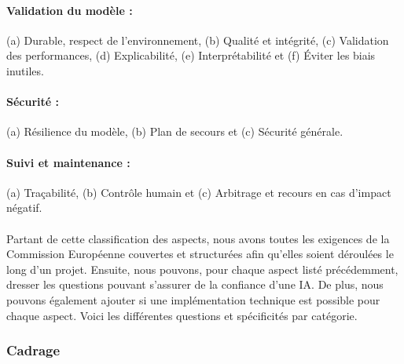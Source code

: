 \documentclass[10pt, french, a4paper]{report}
\begin{document}
\paragraph{Validation du modèle :} (a) Durable, respect de l'environnement, (b) Qualité et intégrité, (c) Validation des performances, (d) Explicabilité, (e) Interprétabilité et (f) \uppercase{é}viter les biais inutiles.

\paragraph{Sécurité :} (a) Résilience du modèle, (b) Plan de secours et (c) Sécurité générale.

\paragraph{Suivi et maintenance :} (a) Traçabilité, (b) Contrôle humain et (c) Arbitrage et recours en cas d'impact négatif.

\paragraph{}
Partant de cette classification des aspects, nous avons toutes les exigences de la Commission Européenne couvertes et structurées afin qu'elles soient déroulées le long d'un projet. Ensuite, nous pouvons, pour chaque aspect listé précédemment, dresser les questions pouvant s'assurer de la confiance d'une IA. De plus, nous pouvons également ajouter si une implémentation technique est possible pour chaque aspect. Voici les différentes questions et spécificités par catégorie.

\subsubsection{Cadrage}
\end{document}

